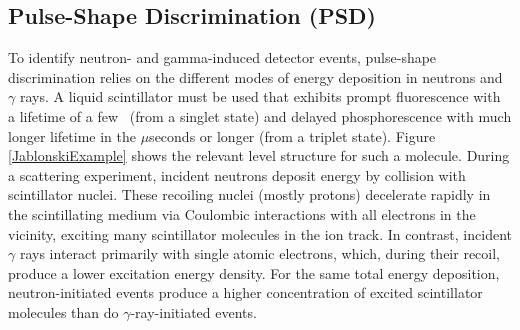 \subsection{Pulse-Shape Discrimination (PSD)}
To identify neutron- and gamma-induced detector events, pulse-shape discrimination
relies on the different modes of energy deposition in neutrons and $\gamma$ rays.
A liquid scintillator must be used that exhibits prompt fluorescence with a
lifetime of a few \nano\second\ (from a singlet
state) and delayed phosphorescence with much longer lifetime in the $\mu$seconds
or longer (from a triplet state). Figure \ref{JablonskiExample} shows the
relevant level structure for such a molecule. During a scattering experiment,
incident neutrons deposit energy by collision with scintillator nuclei.
These recoiling nuclei (mostly protons) decelerate rapidly in the scintillating
medium via Coulombic interactions with all electrons in the vicinity,
exciting many scintillator molecules in the
ion track. In contrast, incident $\gamma$ rays interact primarily with
single atomic electrons, which, during their recoil, produce a lower excitation energy density.
For the same total energy deposition,
neutron-initiated events produce a higher 
concentration of excited scintillator molecules than do $\gamma$-ray-initiated
events.

